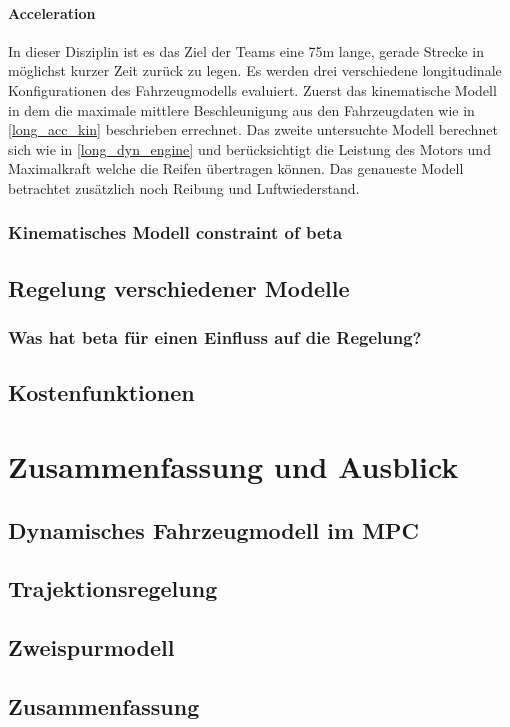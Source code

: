 \documentclass{like}
\begin{document}
\subsubsection*{Acceleration}
In dieser Disziplin ist es das Ziel der Teams eine 75m lange, gerade Strecke in möglichst kurzer Zeit zurück zu legen.
Es werden drei verschiedene longitudinale Konfigurationen des Fahrzeugmodells evaluiert. Zuerst das kinematische Modell in dem die maximale mittlere Beschleunigung aus den Fahrzeugdaten wie in \ref{long_acc_kin} beschrieben errechnet. Das zweite untersuchte Modell berechnet sich wie in \ref{long_dyn_engine} und berücksichtigt die Leistung des Motors und Maximalkraft welche die Reifen übertragen können.
Das genaueste Modell betrachtet zusätzlich noch Reibung und Luftwiederstand. 




\subsection{Kinematisches Modell constraint of beta}
\section{Regelung verschiedener Modelle}
\subsection{Was hat beta für einen Einfluss auf die Regelung?}
\section{Kostenfunktionen}



\chapter[Ausblick]{Zusammenfassung und Ausblick}
\section{Dynamisches Fahrzeugmodell im MPC}
\section{Trajektionsregelung}
\section{Zweispurmodell}
\section{Zusammenfassung}
\end{document}
